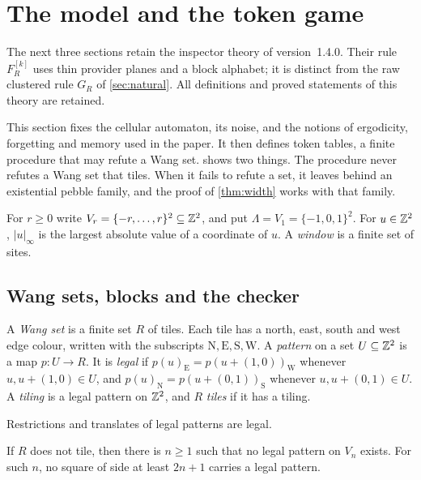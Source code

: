 \section{The model and the token game}\label{sec:setting}

The next three sections retain the inspector theory of version~1.4.0. Their rule $F_R^{[k]}$ uses thin provider planes and a block alphabet; it is distinct from the raw clustered rule $G_R$ of \cref{sec:natural}. All definitions and proved statements of this theory are retained.


This section fixes the cellular automaton, its noise, and the notions of ergodicity, forgetting and memory used in the paper. It then defines token tables, a finite procedure that may refute a Wang set.  shows two things. The procedure never refutes a Wang set that tiles. When it fails to refute a set, it leaves behind an existential pebble family, and the proof of \cref{thm:width} works with that family.

For $r\ge0$ write $V_r=\{-r,\dots,r\}^2\subseteq\mathbb{Z}^2$, and put $\Lambda=V_1=\{-1,0,1\}^2$. For $u\in\mathbb{Z}^2$, $|u|_\infty$ is the largest absolute value of a coordinate of $u$. A \emph{window} is a finite set of sites.

\subsection{Wang sets, blocks and the checker}\label{set:sub-wang}

\begin{definition}\label{set:def-wang}
A \emph{Wang set} is a finite set $R$ of tiles. Each tile has a north, east, south and west edge colour, written with the subscripts $\mathrm N,\mathrm E,\mathrm S,\mathrm W$. A \emph{pattern} on a set $U\subseteq\mathbb{Z}^2$ is a map $p\colon U\to R$. It is \emph{legal} if $p(u)_{\mathrm E}=p(u+(1,0))_{\mathrm W}$ whenever $u,u+(1,0)\in U$, and $p(u)_{\mathrm N}=p(u+(0,1))_{\mathrm S}$ whenever $u,u+(0,1)\in U$. A \emph{tiling} is a legal pattern on $\mathbb{Z}^2$, and $R$ \emph{tiles} if it has a tiling.
\end{definition}

Restrictions and translates of legal patterns are legal.

\begin{lemma}[Compactness]\label{set:compact}
If $R$ does not tile, then there is $n\ge1$ such that no legal pattern on $V_n$ exists. For such $n$, no square of side at least $2n+1$ carries a legal pattern.
\end{lemma}

